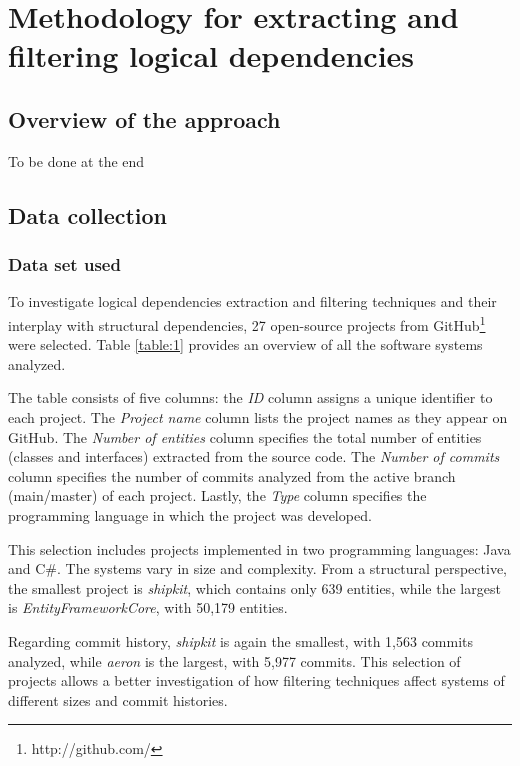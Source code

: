\chapter{Methodology for extracting and filtering logical dependencies}
\label{extraction}

\section{Overview of the approach}
\label{sec:overview_approach}
To be done at the end


\section{Data collection}
\label{sec:data_collection}


\subsection{Data set used}
\label{subsec:data_sets_used}

\hspace{4em}To investigate logical dependencies extraction and filtering techniques and their interplay with structural dependencies, 27 open-source projects from GitHub\footnote{http://github.com/} were selected. Table \ref{table:1} provides an overview of all the software systems analyzed.

The table consists of five columns: the \textit{ID} column assigns a unique identifier to each project. The \textit{Project name} column lists the project names as they appear on GitHub. The \textit{Number of entities} column specifies the total number of entities (classes and interfaces) extracted from the source code. The \textit{Number of commits} column specifies the number of commits analyzed from the active branch (main/master) of each project. Lastly, the \textit{Type} column specifies the programming language in which the project was developed.

This selection includes projects implemented in two programming languages: Java and C\#. The systems vary in size and complexity. From a structural perspective, the smallest project is \textit{shipkit}, which contains only 639 entities, while the largest is \textit{EntityFrameworkCore}, with 50,179 entities.

Regarding commit history, \textit{shipkit} is again the smallest, with 1,563 commits analyzed, while \textit{aeron} is the largest, with 5,977 commits. This selection of projects allows a better investigation of how filtering techniques affect systems of different sizes and commit histories.


